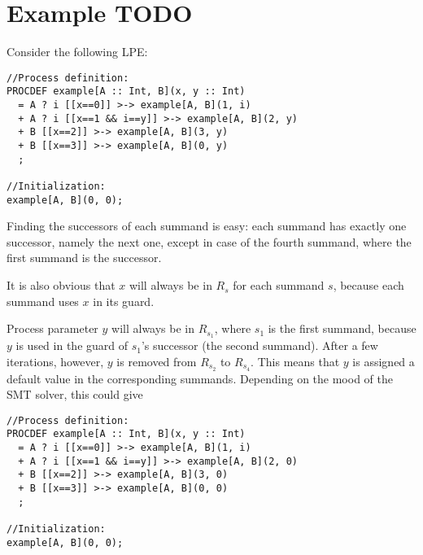 \section{Example TODO}

Consider the following LPE:

\begin{lstlisting}
//Process definition:
PROCDEF example[A :: Int, B](x, y :: Int)
  = A ? i [[x==0]] >-> example[A, B](1, i)
  + A ? i [[x==1 && i==y]] >-> example[A, B](2, y)
  + B [[x==2]] >-> example[A, B](3, y)
  + B [[x==3]] >-> example[A, B](0, y)
  ;

//Initialization:
example[A, B](0, 0);
\end{lstlisting}

Finding the successors of each summand is easy: each summand has exactly one successor, namely the next one, except in case of the fourth summand, where the first summand is the successor.

It is also obvious that $x$ will always be in $R_s$ for each summand $s$, because each summand uses $x$ in its guard.

Process parameter $y$ will always be in $R_{s_1}$, where $s_1$ is the first summand, because $y$ is used in the guard of $s_1$'s successor (the second summand).
After a few iterations, however, $y$ is removed from $R_{s_2}$ to $R_{s_4}$.
This means that $y$ is assigned a default value in the corresponding summands.
Depending on the mood of the SMT solver, this could give

\begin{lstlisting}
//Process definition:
PROCDEF example[A :: Int, B](x, y :: Int)
  = A ? i [[x==0]] >-> example[A, B](1, i)
  + A ? i [[x==1 && i==y]] >-> example[A, B](2, 0)
  + B [[x==2]] >-> example[A, B](3, 0)
  + B [[x==3]] >-> example[A, B](0, 0)
  ;

//Initialization:
example[A, B](0, 0);
\end{lstlisting}




